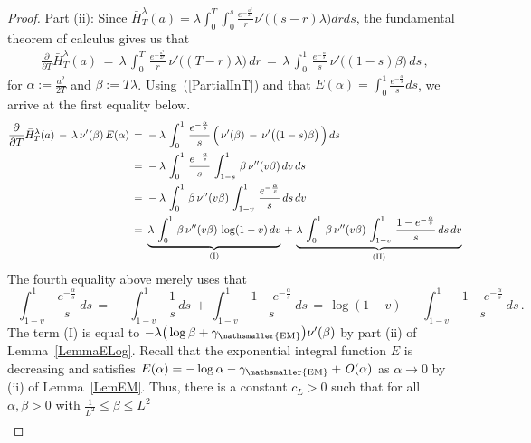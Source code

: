 \documentclass[10pt]{article}
\numberwithin{equation}{section}
\theoremstyle{definition}
\begin{document}
\begin{proof}
\noindent Part (ii):  Since $\bar{H}_{T}^{\lambda}(a)= \lambda  \int_0^T\int_0^s \frac{ e^{-\frac{a^2}{2r }} }{r 
 }\nu'\big((s-r)\lambda\big)drds$, the fundamental theorem of calculus gives us that
 \begin{align}\label{PartialInT}
     \frac{\partial}{\partial T}\bar{H}_{T}^{\lambda}(a) \,=\, \lambda \,\int_0^{T} \,\frac{e^{-\frac{a^2}{2r}}}{r} \,\nu'\big( (T-r)\lambda\big)\,dr\,=\, \lambda \,\int_0^{1} \,\frac{e^{-\frac{\alpha}{s}}}{s}\, \nu'\big( (1-s)\beta\big)\,ds\,,
 \end{align}
 for $\alpha:=\frac{ a^2 }{2T }$ and $\beta:=T\lambda $.   Using~(\ref{PartialInT}) and that $ E(\alpha)= \int_0^{1} \frac{  e^{-\frac{\alpha}{s}} }{  s } ds$, we arrive at the first equality below.
 \begin{align*} \frac{\partial }{\partial T}\bar{H}_{T}^{\lambda}(a)\,-\, \lambda \,\nu'(\beta ) \,E (\alpha)  \,=\,&\, -\lambda \,\int_0^{1}\, \frac{e^{-\frac{\alpha}{s}}}{s} \,\Big(\, \nu'(\beta) \,- \,\nu'\big((1-s)\beta\big)   \,\Big)\, ds \nonumber  \\
 \,=\,&\, -\lambda \,\int_0^{1} \,\frac{e^{-\frac{\alpha}{s}}}{s} \,\int_{1-s }^{1  } \,\beta\,\nu'' ( v \beta)\,dv\,  ds  \nonumber \\
 \,=\,&\, -\lambda \,\int_0^{1} \,\beta \,\nu'' ( v\beta)\, \int_{1-v }^{1  }\, \frac{e^{-\frac{\alpha}{s}}}{s} \,  ds \, dv \nonumber 
 \\
 \,=\,&\, \underbrace{\lambda \, \int_0^{1}\,\beta \,\nu'' ( v\beta)\, \log (1-v)\, dv}_{ \textup{(I)}}\,+\,\underbrace{\lambda\, \int_0^{1} \,\beta  \,\nu'' ( v \beta)\, \int_{1-v }^{1  } \,\frac{1-e^{-\frac{\alpha}{s}}  }{s} \,  ds  \, dv}_{\text{(II)}} 
 \end{align*}
The fourth equality above merely uses that 
$$ -\int_{1-v }^{1  } \,\frac{e^{-\frac{\alpha}{s}}}{s} \,  ds \,=\,- \int_{1-v }^{1  }\, \frac{1 }{s}\,   ds\,+\, \int_{1-v }^{1  } \,\frac{1-e^{-\frac{\alpha}{s}} }{s} \,  ds \,=\, \log (1-v) \,+\, \int_{1-v }^{1  }\, \frac{1-e^{-\frac{\alpha}{s}} }{s} \,  ds\,. $$
The term (I) is equal to $ -\lambda \big(\log \beta  +\gamma_{\mathsmaller{\textup{EM}}}\big)\nu'(\beta)$ by part (ii) of Lemma~\ref{LemmaELog}.  Recall that the exponential integral function $E$ is decreasing and satisfies   $E(\alpha )=-\log \alpha-\gamma_{\mathsmaller{\textup{EM}}}+\mathit{O}(\alpha)$ as $\alpha\rightarrow 0$ by (ii) of Lemma~\ref{LemEM}.  Thus, there is a constant $c_L>0$ such that for all $\alpha,\beta>0$ with $ \frac{1}{L^2}\leq  \beta\leq L^2$
\begin{align*}

\end{align*}
\end{proof}
\end{document}

